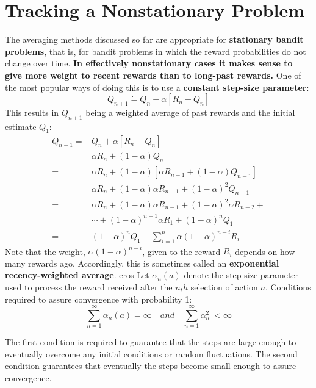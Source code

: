 \section{Tracking a Nonstationary Problem}
The averaging methods discussed so far are appropriate for \textbf{stationary bandit problems}, that is, for
bandit problems in which the reward probabilities do not change over time. \textbf{In effectively nonstationary cases it makes sense to give more weight to recent rewards than to long-past rewards.} One of the most popular ways
of doing this is to use a \textbf{constant step-size parameter}:
\begin{equation}
    Q_{n+1} \dot{=} Q_n+\alpha[R_n-Q_n]
\end{equation}
This results in $Q_{n+1}$ being a weighted average of past rewards and the initial estimate $Q_1$:
\begin{equation}
\begin{split}
    Q_{n+1} = & Q_{n} + \alpha[R_n-Q_n]\\
            = & \alpha R_n + (1-\alpha)Q_n\\
            = & \alpha R_n + (1-\alpha)[\alpha R_{n-1}+(1-\alpha) Q_{n-1}]\\
            = & \alpha R_n + (1-\alpha)\alpha R_{n-1} +(1-\alpha)^2 Q_{n-1}\\
            = & \alpha R_n + (1-\alpha)\alpha R_{n-1} + (1-\alpha)^2 \alpha R_{n-2} + \\
                            & \cdots+(1-\alpha)^{n-1}\alpha R_1 + (1-\alpha)^n Q_1\\
            = & (1-\alpha)^nQ_1+\sum_{i=1}^{n}\alpha(1-\alpha)^{n-i}R_i
\end{split}
\end{equation}
Note that the weight, $\alpha(1-\alpha)^{n-i}$, given to the reward $R_i$ depends on how many rewards ago, Accordingly, this is sometimes called an \textbf{exponential recency-weighted average}.
eros
Let $\alpha_n(a)$ denote the step-size parameter used to process the reward received after the $n_th$ selection of action $a$. Conditions required to assure convergence with probability 1:
\begin{equation}
\sum_{n=1}^{\infty} \alpha_n(a) = \infty  \quad and \quad \sum_{n=1}^{\infty} \alpha_n^2 \ < \infty
\end{equation}

The first condition is required to guarantee that the steps are large enough to eventually overcome any initial conditions or random fluctuations. The second condition guarantees that eventually the steps become small enough to assure convergence.

